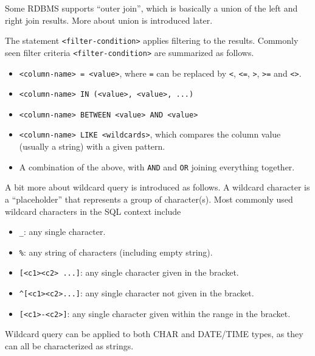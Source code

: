 Some RDBMS supports ``outer join'', which is basically a union of the left and right join results. More about union is introduced later.

The statement \verb|<filter-condition>| applies filtering to the results. Commonly seen filter criteria \verb|<filter-condition>| are summarized as follows.
\begin{itemize}
  \item \verb|<column-name> = <value>|, where \verb|=| can be replaced by \verb|<|, \verb|<=|, \verb|>|, \verb|>=| and \verb|<>|.
  \item \verb|<column-name> IN (<value>, <value>, ...)|
  \item \verb|<column-name> BETWEEN <value> AND <value>|
  \item \verb|<column-name> LIKE <wildcards>|, which compares the column value (usually a string) with a given pattern.
  \item A combination of the above, with \verb|AND| and \verb|OR| joining everything together.
\end{itemize}

A bit more about wildcard query is introduced as follows. A wildcard character is a ``placeholder'' that represents a group of character(s). Most commonly used wildcard characters in the SQL context include
\begin{itemize}
  \item \verb|_|: any single character.
  \item \verb|%|: any string of characters (including empty string).
  \item \verb|[<c1><c2> ...]|: any single character given in the bracket.
  \item \verb|^[<c1><c2>...]|: any single character not given in the bracket.
  \item \verb|[<c1>-<c2>]|: any single character given within the range in the bracket.
\end{itemize}
Wildcard query can be applied to both CHAR and DATE/TIME types, as they can all be characterized as strings.

